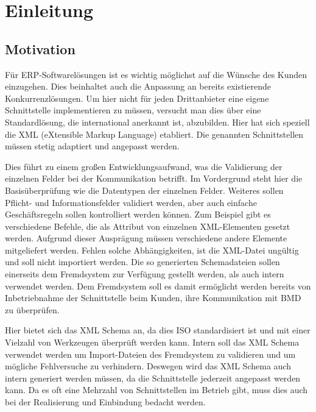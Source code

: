 \chapter{Einleitung}
\label{cha:Einleitung}

\section{Motivation}
Für ERP-Softwarelösungen ist es wichtig möglichst auf die Wünsche des Kunden einzugehen. Dies beinhaltet auch die Anpassung an bereits existierende Konkurrenzlösungen. 
Um hier nicht für jeden Drittanbieter eine eigene Schnittstelle implementieren zu müssen, versucht man dies über eine Standardlösung, die international anerkannt ist, abzubilden. Hier hat sich speziell die XML (eXtensible Markup Language) etabliert. Die genannten Schnittstellen müssen stetig adaptiert und angepasst werden. 

Dies führt zu einem großen Entwicklungsaufwand, was die Validierung der einzelnen Felder bei der Kommunikation betrifft. 
Im Vordergrund steht hier die Basisüberprüfung wie die Datentypen der einzelnen Felder. Weiteres sollen Pflicht- und Informationsfelder validiert werden, aber auch einfache Geschäftsregeln sollen kontrolliert werden können. 
Zum Beispiel gibt es verschiedene Befehle, die als Attribut von einzelnen XML-Elementen gesetzt werden. Aufgrund dieser Ausprägung müssen verschiedene andere Elemente mitgeliefert werden. Fehlen solche Abhängigkeiten, ist die XML-Datei ungültig und soll nicht importiert werden.
Die so generierten Schemadateien sollen einerseits dem Fremdsystem zur Verfügung gestellt werden, als auch intern verwendet werden. 
Dem Fremdsystem soll es damit ermöglicht werden bereits von Inbetriebnahme der Schnittstelle beim Kunden, ihre Kommunikation mit BMD zu überprüfen. 

Hier bietet sich das XML Schema an, da dies ISO standardisiert ist und mit einer Vielzahl von Werkzeugen überprüft werden kann. 
Intern soll das XML Schema verwendet werden um Import-Dateien des Fremdsystem zu validieren und  um mögliche Fehlversuche zu verhindern. Deswegen wird das XML Schema auch intern generiert werden müssen, da die Schnittstelle jederzeit angepasst werden kann.
Da es oft eine Mehrzahl von Schnittstellen im Betrieb gibt, muss dies auch bei der Realisierung und Einbindung bedacht werden.



